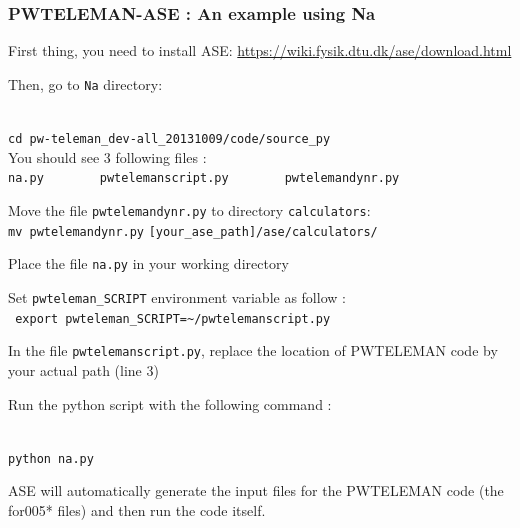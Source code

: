 \documentclass[10pt]{beamer}
\begin{document}
\begin{frame}
\frametitle{PWTELEMAN-ASE : An example using Na}
\begin{enumerate}

\item \small{First thing, you need to install ASE: \href{https://wiki.fysik.dtu.dk/ase/download.html}{https://wiki.fysik.dtu.dk/ase/download.html}
     \vspace*{0.2cm}
     
\item Then, go to {\tt Na} directory:}\\
\small{{\tt cd pw-teleman\_dev-all\_20131009/code/source\_py}}\\
You should see 3 following files : \\
{\tt na.py}~~~~~~~~{\tt pwtelemanscript.py}~~~~~~~~{\tt pwtelemandynr.py}\\
\vspace*{0.2cm}

\item Move the file {\tt pwtelemandynr.py} to directory {\tt calculators}:\\
\footnotesize{{\tt mv pwtelemandynr.py} {\tt [your\_ase\_path]/ase/calculators/}}\\
\vspace*{0.2cm}

\item \small{Place the file {\tt na.py} in your working directory}
\vspace*{0.2cm}

\item Set {\tt pwteleman\_SCRIPT} environment variable as follow :\\ 
\footnotesize{{\tt 
export pwteleman\_SCRIPT=\textasciitilde/pwtelemanscript.py}}
\vspace*{0.2cm}

\item \small{In the file {\tt pwtelemanscript.py}, replace the location of PWTELEMAN code by your actual path (line 3)
\vspace*{0.2cm}

\item Run the python script with the following command : }\\
{\tt python na.py}
\end{enumerate}

\small{ASE will automatically generate the input files for the PWTELEMAN code (the for005* files) and then run the code itself. }

\end{frame}
\end{document}
